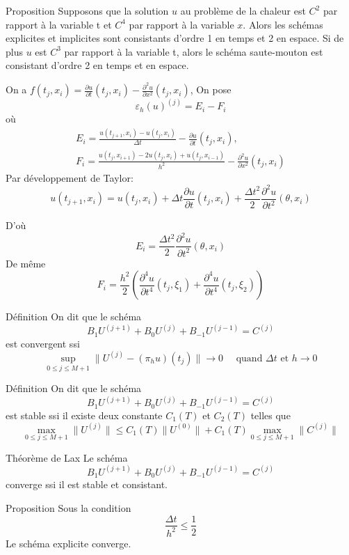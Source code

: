 \documentclass{beamer}
\begin{document}
   \begin{frame}    
  \begin{block}{Proposition}
  Supposons que la solution $u$ au problème de la chaleur est $C^2$ par rapport à la variable t et $C^4$ par rapport à la variable $x$. Alors les schémas explicites et implicites sont consistants d'ordre 1 en temps et 2 en espace.
Si de plus $u$ est $C^3$ par rapport à la variable t, alors le schéma saute-mouton est consistant d'ordre 2 en temps et en espace.
  \end{block}
  On a $f(t_j,x_i)=\frac{\partial u}{\partial t}(t_j,x_i)-\frac{\partial^2 u}{\partial x^2}(t_j,x_i)$, On pose
  \[\varepsilon_h(u)^{(j)} =E_i-F_i\]
  où
  \[\begin{array}{l}
E_i=\frac{u(t_{j+1},x_i)-u(t_j,x_i)}{\Delta t}  -\frac{\partial u}{\partial t}(t_j,x_i),\\
F_i=\frac{u(t_{j},x_{i+1})-2u(t_j,x_i)+u(t_{j},x_{i-1})  }{h^2}-\frac{\partial^2 u}{\partial x^2}(t_j,x_i)
  \end{array}
  \]
  Par développement de Taylor:
  \[u(t_{j+1},x_i)=u(t_{j},x_i)+\Delta t  \frac{\partial u}{\partial t}(t_j,x_i) + \frac{\Delta t^2}{2}\frac{\partial^2 u}{\partial t^2}(\theta,x_i)\]
  \end{frame}
   
   \begin{frame}    
  D'où
  \[E_i=\frac{\Delta t^2}{2}\frac{\partial^2 u}{\partial t^2}(\theta,x_i)\]
De même
 \[F_i=\frac{h^2}{2}\left(\frac{\partial^4 u}{\partial t^4}(t_j,\xi_1)+\frac{\partial^4 u}{\partial t^4}(t_j,\xi_2)\right)\]
 \begin{block}{Définition}
 On dit que le schéma
  \[B_1U^{(j+1)} + B_0U^{(j)} + B_{-1}U^{(j-1)} = C^{(j)}\]
  est convergent ssi
  \[ \sup_{0\leq j \leq M+1}\|U^{(j)}-(\pi_hu)(t_j)\|\to 0\quad \mbox{ quand } \Delta t \mbox{ et } h\to 0\]
  \end{block}
   \end{frame}
   
    \begin{frame}    
 \begin{block}{Définition}
 On dit que le schéma
  \[B_1U^{(j+1)} + B_0U^{(j)} + B_{-1}U^{(j-1)} = C^{(j)}\]
  est stable ssi il existe deux constante $C_1(T)$ et $C_2(T)$ telles que
  \[ \max_{0\leq j \leq M+1}\|U^{(j)}\|\leq C_1(T) \|U^{(0)}\| + C_1(T)\max_{0\leq j \leq M+1} \|C^{(j)}\| \]
  \end{block}
  
   \begin{block}{Théorème de Lax}
 Le schéma
  \[B_1U^{(j+1)} + B_0U^{(j)} + B_{-1}U^{(j-1)} = C^{(j)}\]
  converge ssi il est  stable et consistant.
   \end{block}
  
   \end{frame}
   
   \begin{frame}    
 \begin{block}{Proposition}
 Sous la condition \[\frac{\Delta t}{h^2}\leq \frac 12\]
 Le schéma explicite converge.
  \end{block}
  
  
  
   \end{frame}
   
 
\end{document}
